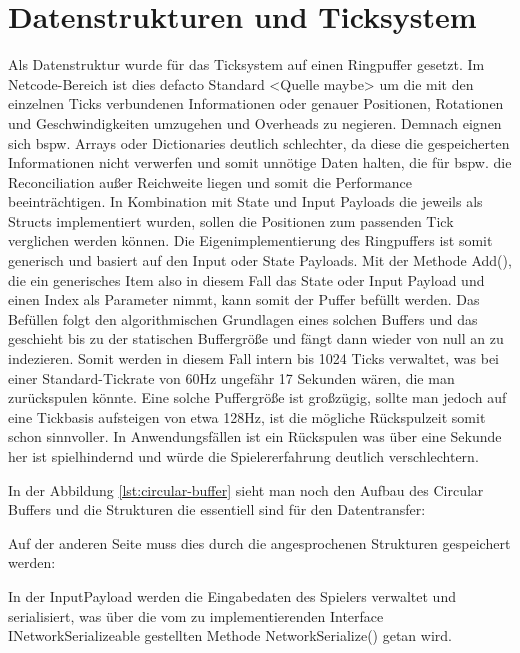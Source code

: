 \section{Datenstrukturen und Ticksystem}
Als Datenstruktur wurde für das Ticksystem auf einen Ringpuffer gesetzt. Im Netcode-Bereich ist dies defacto Standard <Quelle maybe> um die mit den einzelnen Ticks verbundenen Informationen oder genauer Positionen, Rotationen und Geschwindigkeiten umzugehen und Overheads zu negieren. 
Demnach eignen sich bspw. Arrays oder Dictionaries deutlich schlechter, da diese die gespeicherten Informationen nicht verwerfen und somit unnötige Daten halten, die für bspw. die Reconciliation außer Reichweite liegen und somit die Performance beeinträchtigen.
In Kombination mit State und Input Payloads die jeweils als Structs implementiert wurden, sollen die Positionen zum passenden Tick verglichen werden können.
Die Eigenimplementierung des Ringpuffers ist somit generisch und basiert auf den Input oder State Payloads. Mit der Methode Add(), die ein generisches Item also in diesem Fall das State oder Input Payload und einen Index als Parameter nimmt, kann somit der Puffer befüllt werden.
Das Befüllen folgt den algorithmischen Grundlagen eines solchen Buffers und das geschieht bis zu der statischen Buffergröße und fängt dann wieder von null an zu indezieren. 
Somit werden in diesem Fall intern bis 1024 Ticks verwaltet, was bei einer Standard-Tickrate von 60Hz ungefähr 17 Sekunden wären, die man zurückspulen könnte. 
Eine solche Puffergröße ist großzügig, sollte man jedoch auf eine Tickbasis aufsteigen von etwa 128Hz, ist die mögliche Rückspulzeit somit schon sinnvoller. In Anwendungsfällen ist ein Rückspulen was über eine Sekunde her ist spielhindernd und würde die Spielererfahrung deutlich verschlechtern. 

\newpage

In der Abbildung \ref{lst:circular-buffer} sieht man noch den Aufbau des Circular Buffers und die Strukturen die essentiell sind für den Datentransfer:


\newpage
Auf der anderen Seite muss dies durch die angesprochenen Strukturen gespeichert werden:

In der InputPayload werden die Eingabedaten des Spielers verwaltet und serialisiert, was über die vom zu implementierenden Interface INetworkSerializeable gestellten Methode NetworkSerialize() getan wird.


